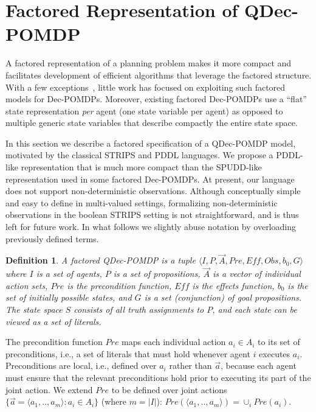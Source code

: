 \documentclass[letterpaper]{article}
\newtheorem{definition}{Definition}
\theoremstyle{definition}
\begin{document}
\section{Factored Representation of QDec-POMDP}

A factored representation of a planning problem %
makes it more compact and facilitates development of
efficient algorithms that leverage the factored structure. With a few exceptions~\cite{Oliehoek08,KZTijcai11}, little work has focused on exploiting such factored models for Dec-POMDPs.  Moreover, existing factored Dec-POMDPs
use a ``flat'' state representation {\em per} agent (one state variable per agent) as opposed to multiple generic state variables that describe compactly the entire state space.

In this section we describe a factored specification of a QDec-POMDP model, motivated by the classical STRIPS and PDDL languages. We propose a PDDL-like representation that is much more compact than the SPUDD-like representation used in some factored Dec-POMDPs.
At present, our language does not support non-deterministic observations. Although conceptually simple and easy to define in multi-valued settings, formalizing non-deterministic observations in the boolean STRIPS setting is not straightforward, and is thus left for future work. In what follows we slightly abuse notation by overloading previously defined terms.

\begin{definition}
A factored QDec-POMDP  is a tuple $\langle I,P,\vec{A},\mathit{Pre},\mathit{Eff},\mathit{Obs},b_0,G\rangle$ where $I$ is a set of agents, $P$ is a set of propositions, $\vec{A}$ is a vector of individual action sets,  $\mathit{Pre}$ is the precondition function,
$\mathit{Eff}$ is the effects function, $b_0$ is the set of initially possible states, and $G$ is a set (conjunction) of goal propositions.
The state space $S$ consists of all truth assignments to $P$, and each state can be viewed as a set of literals.
\end{definition}

The precondition function $\mathit{Pre}$ maps each individual action $a_i\in A_i$ to its set of preconditions, i.e., a set of literals that must
hold whenever agent $i$ executes $a_i$. Preconditions are local, i.e., defined over $a_i$ rather than $\vec{a}$, because each agent must ensure that the relevant preconditions hold prior to executing its part of the joint action. We extend $\mathit{Pre}$ to be defined over joint actions $\{\vec{a}=\langle a_1,..,a_m\rangle : a_i \in A_i\}$ (where $m=|I|$):
$\mathit{Pre}(\langle a_1,..,a_m\rangle) = \cup_i \mathit{Pre}(a_i)$.
\end{document}
